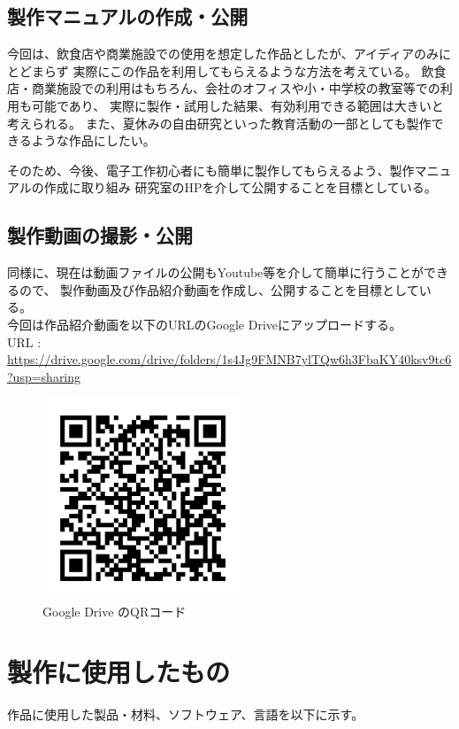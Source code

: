 \documentclass[a4paper]{jsarticle}
\begin{document}
\subsection{製作マニュアルの作成・公開}
今回は、飲食店や商業施設での使用を想定した作品としたが、アイディアのみにとどまらず
実際にこの作品を利用してもらえるような方法を考えている。
飲食店・商業施設での利用はもちろん、会社のオフィスや小・中学校の教室等での利用も可能であり、
実際に製作・試用した結果、有効利用できる範囲は大きいと考えられる。
また、夏休みの自由研究といった教育活動の一部としても製作できるような作品にしたい。\par
そのため、今後、電子工作初心者にも簡単に製作してもらえるよう、製作マニュアルの作成に取り組み
研究室のHPを介して公開することを目標としている。
\subsection{製作動画の撮影・公開}
同様に、現在は動画ファイルの公開もYoutube等を介して簡単に行うことができるので、
製作動画及び作品紹介動画を作成し、公開することを目標としている。\\
今回は作品紹介動画を以下のURLのGoogle Driveにアップロードする。\\
URL : \url{https://drive.google.com/drive/folders/1s4Jg9FMNB7ylTQw6h3FbaKY40ksv9tc6?usp=sharing}
\begin{figure}[htbp]
    \begin{center}
        \includegraphics[width=60mm]{images/QR_drive.png}
        \caption{Google Drive のQRコード}
    \end{center}
\end{figure}
\section{製作に使用したもの}
作品に使用した製品・材料、ソフトウェア、言語を以下に示す。
\end{document}
